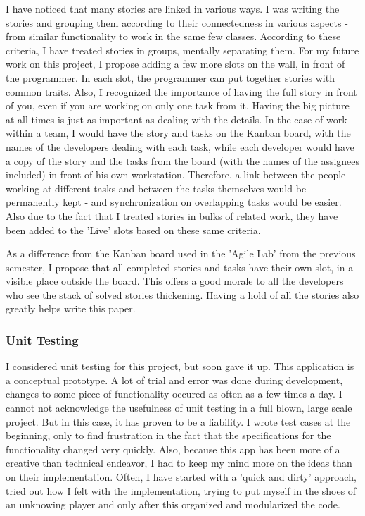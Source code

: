 \documentclass{article}
\begin{document}
I have noticed that many stories are linked in various ways. I was writing the
stories and grouping them according to their connectedness in various aspects -
from similar functionality to work in the same few classes. According to these
criteria, I have treated stories in groups, mentally separating them. For
my future work on this project, I propose adding a few more slots on the wall,
in front of the programmer. In each slot, the programmer can put together
stories with common traits. Also, I recognized the importance of having the full
story in front of you, even if you are working on only one task from it. Having
the big picture at all times is just as important as dealing with the details.
In the case of work within a team, I would have the story and tasks on the
Kanban board, with the names of the developers dealing with each task, while
each developer would have a copy of the story and the tasks from the board
(with the names of the assignees included) in front of his own workstation.
Therefore, a link between the people working at different tasks and between
the tasks themselves would be permanently kept - and synchronization on
overlapping tasks would be easier. Also due to the fact that I treated
stories in bulks of related work, they have been added to the 'Live'
slots based on these same criteria. \newline

As a difference from the Kanban board used in the 'Agile Lab' from the previous
semester, I propose that all completed stories and tasks have their own slot, in
a visible place outside the board. This offers a good morale to all the
developers who see the stack of solved stories thickening. Having a hold
of all the stories also greatly helps write this paper. \newline

\subsubsection{Unit Testing}

I considered unit testing for this project, but soon gave it up. This
application is a conceptual prototype. A lot of trial and error was done during
development, changes to some piece of functionality occured as often as a few
times a day. I cannot not acknowledge the usefulness of unit testing in a full
blown, large scale project. But in this case, it has proven to be a liability. I
wrote test cases at the beginning, only to find frustration in the fact that the
specifications for the functionality changed very quickly. Also, because this
app has been more of a creative than technical endeavor, I had to keep my mind
more on the ideas than on their implementation. Often, I have started with a
'quick and dirty' approach, tried out how I felt with the implementation, trying
to put myself in the shoes of an unknowing player and only after this organized
and modularized the code.
\end{document}
